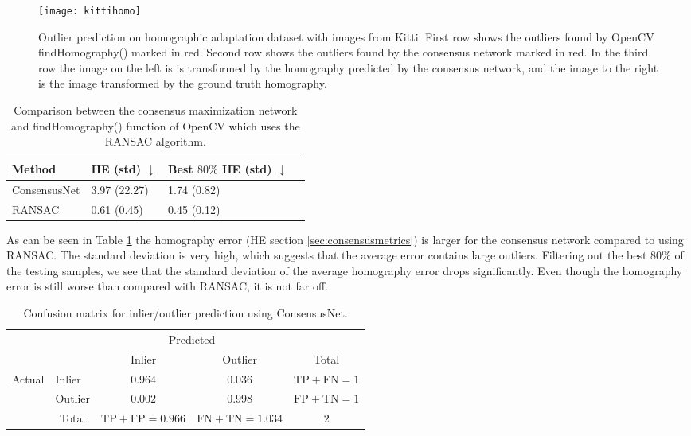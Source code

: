 \begin{figure}[H]
	\centering
	\texttt{[image: kittihomo]}
	\caption{Outlier prediction on homographic adaptation dataset with images from Kitti. First row shows the outliers found by OpenCV findHomography() marked in red. Second row shows the outliers found by the consensus network marked in red. In the third row the image on the left is is transformed by the homography predicted by the consensus network, and the image to the right is the image transformed by the ground truth homography.}
	\label{fig:kittihomo}
\end{figure}

\begin{table}[H]
	\centering
	\begin{tabular}{|l|l|l|l|}
		\hline
		Method & HE (std) $\downarrow$ & Best $80\%$ HE (std) $\downarrow$ \\
		\hline
		ConsensusNet & 3.97 (22.27) & 1.74 (0.82) \\
		RANSAC & 0.61 (0.45) & 0.45 (0.12) \\
		\hline
	\end{tabular}
	\caption{Comparison between the consensus maximization network and findHomography() function of OpenCV which uses the RANSAC algorithm.}
	\label{table:consensusbenchmark}
\end{table}

As can be seen in Table \ref{table:consensusbenchmark} the homography error (HE section \ref{sec:consensusmetrics}) is larger for the consensus network compared to using RANSAC. The standard deviation is very high, which suggests that the average error contains large outliers. Filtering out the best 80\% of the testing samples, we see that the standard deviation of the average homography error drops significantly. Even though the homography error is still worse than compared with RANSAC, it is not far off.

\begin{table}[H]
\centering
\begin{tabular}{l|l|c|c|c}
	\multicolumn{2}{c}{}&\multicolumn{2}{c}{Predicted}&\\
	\cline{3-4}
	\multicolumn{2}{c|}{}&Inlier&Outlier&\multicolumn{1}{c}{Total}\\
	\cline{2-4}
	\multirow{2}{*}{Actual}& Inlier & $0.964$ & $0.036$ & $\mathrm{TP}+\mathrm{FN}=1$\\
	\cline{2-4}
	& Outlier & $0.002$ & $0.998$ & $\mathrm{FP}+\mathrm{TN}=1$\\
	\cline{2-4}
	\multicolumn{1}{c}{} & \multicolumn{1}{c}{Total} & \multicolumn{1}{c}{$\mathrm{TP}+\mathrm{FP}=0.966$} & \multicolumn{    1}{c}{$\mathrm{FN}+\mathrm{TN}=1.034$} & \multicolumn{1}{c}{$2$}\\
\end{tabular}
	\caption{Confusion matrix for inlier/outlier prediction using ConsensusNet.}
	\label{table:consensusnetconfusion}
\end{table}



